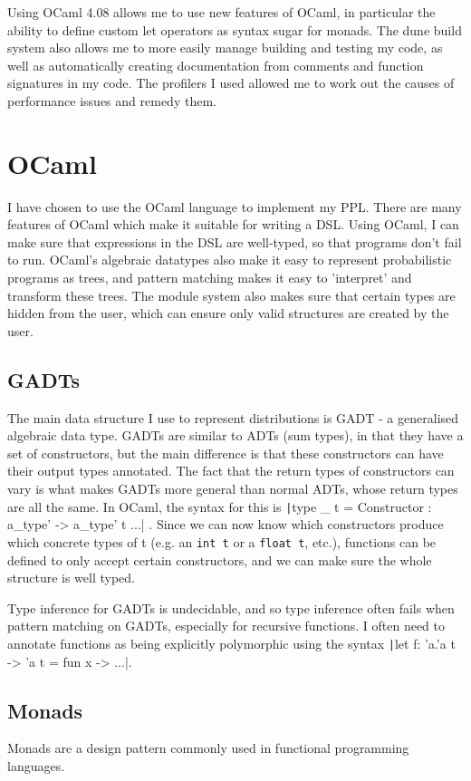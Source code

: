 Using OCaml 4.08 allows me to use new features of OCaml, in particular the ability to define custom let operators as syntax sugar for monads. The dune build system also allows me to more easily manage building and testing my code, as well as automatically creating documentation from comments and function signatures in my code. The profilers I used allowed me to work out the causes of performance issues and remedy them.

\section{OCaml}
I have chosen to use the OCaml language to implement my PPL. There are many features of OCaml which make it suitable for writing a DSL. Using OCaml, I can make sure that expressions in the DSL are well-typed, so that programs don't fail to run. OCaml's algebraic datatypes also make it easy to represent probabilistic programs as trees, and pattern matching makes it easy to 'interpret' and transform these trees. The module system also makes sure that certain types are hidden from the user, which can ensure only valid structures are created by the user.

\subsection{GADTs}
The main data structure I use to represent distributions is GADT - a generalised algebraic data type. GADTs are similar to ADTs (sum types), in that they have a set of constructors, but the main difference is that these constructors can have their output types annotated. The fact that the return types of constructors can vary is what makes GADTs more general than normal ADTs, whose return types are all the same. In OCaml, the syntax for this is \texttt|type _ t = Constructor : a_type' -> a_type' t ...| . Since we can now know which constructors produce which concrete types of t (e.g. an \texttt{int t} or a \texttt{float t}, etc.), functions can be defined to only accept certain constructors, and we can make sure the whole structure is well typed.

Type inference for GADTs is undecidable, and so type inference often fails when pattern matching on GADTs, especially for recursive functions. I often need to annotate functions as being explicitly polymorphic using the syntax \texttt|let f: 'a.'a t -> 'a t = fun x -> ...|.

\subsection{Monads}
Monads are a design pattern commonly used in functional programming languages.
	
